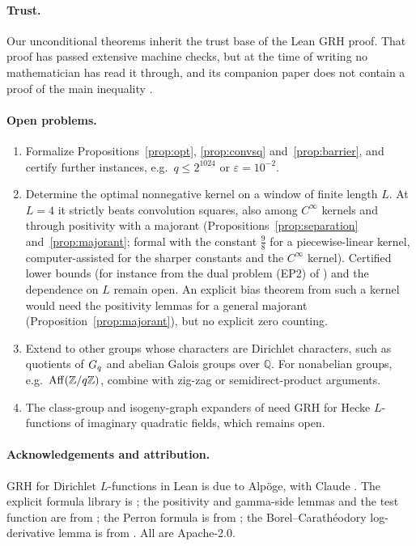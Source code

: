 \paragraph{Trust.}
Our unconditional theorems inherit the trust base of the Lean GRH proof. That proof has passed extensive
machine checks, but at the time of writing no mathematician has read it through, and its companion paper
does not contain a proof of the main inequality \cite{rubinsteinpage}.

\paragraph{Open problems.}
\begin{enumerate}
\item Formalize Propositions~\ref{prop:opt}, \ref{prop:convsq} and~\ref{prop:barrier}, and certify further instances,
  e.g.\ $q\le2^{1024}$ or $\varepsilon=10^{-2}$.
\item Determine the optimal nonnegative kernel on a window of finite length $L$. At $L=4$ it strictly beats convolution squares,
  also among $C^\infty$ kernels and through positivity with a majorant (Propositions~\ref{prop:separation} and~\ref{prop:majorant};
  formal with the constant $\frac98$ for a piecewise-linear kernel, computer-assisted for the sharper constants and the $C^\infty$
  kernel). Certified lower bounds (for instance from the dual problem (EP2) of \cite{cmqr2024}) and the dependence on $L$
  remain open. An explicit bias theorem from such a kernel would need the positivity lemmas for a general majorant
  (Proposition~\ref{prop:majorant}), but no explicit zero counting.
\item Extend to other groups whose characters are Dirichlet characters, such as quotients of $G_q$ and abelian
  Galois groups over $\mathbb Q$. For nonabelian groups, e.g.\ $\mathrm{Aff}(\mathbb{Z}/q\mathbb{Z})$, combine with zig-zag or
  semidirect-product arguments.
\item The class-group and isogeny-graph expanders of \cite{jmv2009} need GRH for Hecke $L$-functions of
  imaginary quadratic fields, which remains open.
\end{enumerate}

\paragraph{Acknowledgements and attribution.}
GRH for Dirichlet $L$-functions in Lean is due to Alpöge, with Claude \cite{alpoge2026,grhlean}. The explicit
formula library is \cite{zeta23}; the positivity and gamma-side lemmas and the test function are from
\cite{grhmiller}; the Perron formula is from \cite{schoenfeldlean}; the Borel--Carath\'eodory log-derivative
lemma is from \cite{rhprimeerror}. All are Apache-2.0.

